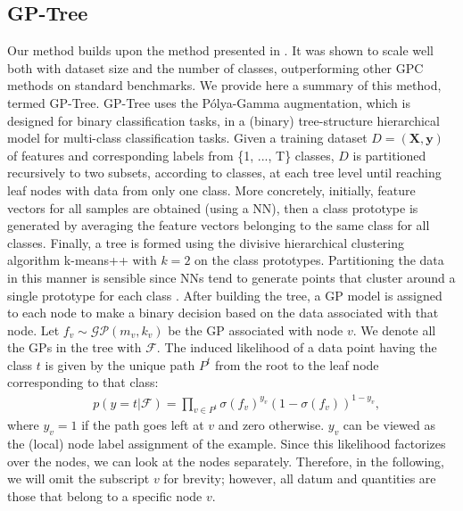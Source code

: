 \documentclass{article}
\newcommand{\bld}[1]{\boldsymbol{#1}}
\def\rvy{{\mathbf{y}}}
\def\rmX{{\mathbf{X}}}
\newcommand{\pg}{P\'olya-Gamma }
\begin{document}
\subsection{GP-Tree} \label{sec_app:gp_tree}
Our method builds upon the method presented in \cite{achituve2021gp_icml}. It was shown to scale well both with dataset size and the number of classes, outperforming other GPC methods on standard benchmarks. We provide here a summary of this method, termed GP-Tree. GP-Tree uses the \pg augmentation, which is designed for binary classification tasks, in a (binary) tree-structure hierarchical model for multi-class classification tasks. Given a training dataset $D = (\rmX, \rvy)$ of features and corresponding labels from \{1, ..., T\} classes, $D$ is partitioned recursively to two subsets, according to classes, at each tree level until reaching leaf nodes with data from only one class. More concretely, initially, feature vectors for all samples are obtained (using a NN), then a class prototype is generated by averaging the feature vectors belonging to the same class for all classes. Finally, a tree is formed using the divisive hierarchical clustering algorithm k-means++ \cite{arthur2007k} with $k=2$ on the class prototypes. Partitioning the data in this manner is sensible since NNs tend to generate points that cluster around a single prototype for each class \cite{snell2017prototypical}. After building the tree, a GP model is assigned to each node to make a binary decision based on the data associated with that node. Let $f_{v} \sim\mathcal{GP}(m_{v}, k_{v})$ be the GP associated with node $v$. We denote all the GPs in the tree with $\bld{\mathcal{F}}$. The induced likelihood of a data point having the class $t$ is given by the unique path $P^t$ from the root to the leaf node corresponding to that class:
\begin{align} \label{eq:tree_likelihood}
    & p(y=t | \bld{\mathcal{F}}) = \prod_{v \in P^t} \sigma(f_{v})^{y_{v}} (1 - \sigma(f_{v}))^{1 - y_{v}},
\end{align}
where $y_{v}=1$ if the path goes left at $v$ and zero otherwise. $y_{v}$ can be viewed as the (local) node label assignment of the example. Since this likelihood factorizes over the nodes, we can look at the nodes separately. Therefore, in the following, we will omit the subscript $v$ for brevity; however, all datum and quantities are those that belong to a specific node $v$.
\end{document}
